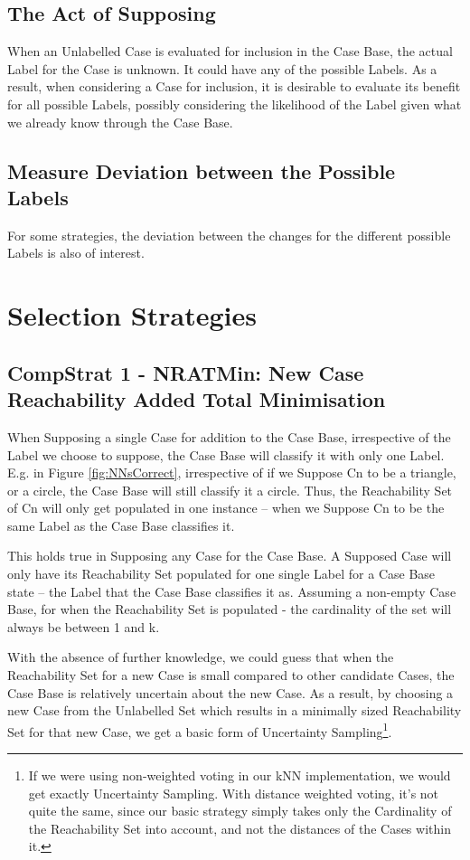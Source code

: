 \documentclass[a4paper,11pt]{report}
\begin{document}
\subsection{The Act of Supposing}
When an Unlabelled Case is evaluated for inclusion in the Case Base, the actual Label for the Case is unknown. It could have any of the possible Labels. As a result, when considering a Case for inclusion, it is desirable to evaluate its benefit for all possible Labels, possibly considering the likelihood of the Label given what we already know through the Case Base.

\subsection{Measure Deviation between the Possible Labels}
For some strategies, the deviation between the changes for the different possible Labels is also of interest.

\section{Selection Strategies}
\subsection{CompStrat 1 - NRATMin: New Case Reachability Added Total Minimisation}
When Supposing a single Case for addition to the Case Base, irrespective of the Label we choose to suppose, the Case Base will classify it with only one Label. E.g. in Figure \ref{fig:NNsCorrect}, irrespective of if we Suppose Cn to be a triangle, or a circle, the Case Base will still classify it a circle. Thus, the Reachability Set of Cn will only get populated in one instance – when we Suppose Cn to be the same Label as the Case Base classifies it.

This holds true in Supposing any Case for the Case Base. A Supposed Case will only have its Reachability Set populated for one single Label for a Case Base state – the Label that the Case Base classifies it as. Assuming a non-empty Case Base, for when the Reachability Set is populated - the cardinality of the set will always be between 1 and k.

With the absence of further knowledge, we could guess that when the Reachability Set for a new Case is small compared to other candidate Cases, the Case Base is relatively uncertain about the new Case. As a result, by choosing a new Case from the Unlabelled Set which results in a minimally sized Reachability Set for that new Case, we get a basic form of Uncertainty Sampling\footnote{If we were using non-weighted voting in our kNN implementation, we would get exactly Uncertainty Sampling. With distance weighted voting, it's not quite the same, since our basic strategy simply takes only the Cardinality of the Reachability Set into account, and not the distances of the Cases within it.}.
\end{document}
